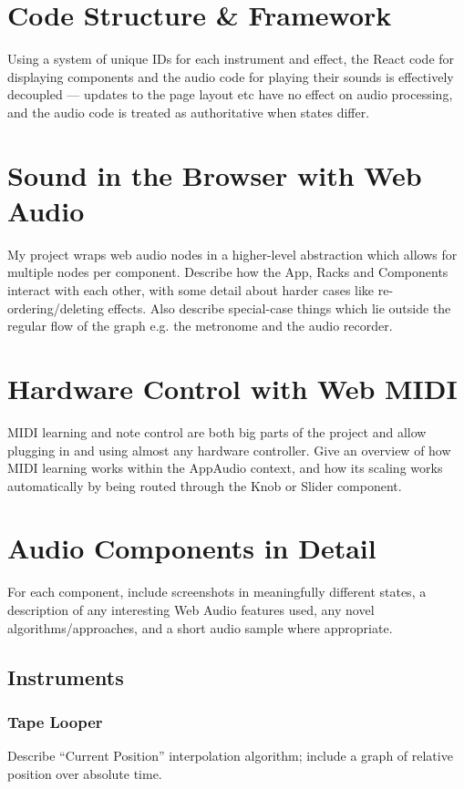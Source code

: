 \documentclass[11pt, a4paper]{article}
\begin{document}
\section{Code Structure \& Framework}
Using a system of unique IDs for each instrument and effect, the React code for displaying components and the audio code for playing their sounds is effectively decoupled --- updates to the page layout etc have no effect on audio processing, and the audio code is treated as authoritative when states differ.
\pagebreak

\section{Sound in the Browser with Web Audio}
My project wraps web audio nodes in a higher-level abstraction which allows for multiple nodes per component. Describe how the App, Racks and Components interact with each other, with some detail about harder cases like re-ordering/deleting effects. Also describe special-case things which lie outside the regular flow of the graph e.g. the metronome and the audio recorder.
\pagebreak

\section{Hardware Control with Web MIDI}
MIDI learning and note control are both big parts of the project and allow plugging in and using almost any hardware controller. Give an overview of how MIDI learning works within the AppAudio context, and how its scaling works automatically by being routed through the Knob or Slider component.
\pagebreak

\section{Audio Components in Detail}
For each component, include screenshots in meaningfully different states, a description of any interesting Web Audio features used, any novel algorithms/approaches, and a short audio sample where appropriate.

\subsection{Instruments}

\subsubsection{Tape Looper}
Describe ``Current Position'' interpolation algorithm; include a graph of relative position over absolute time.
\end{document}
